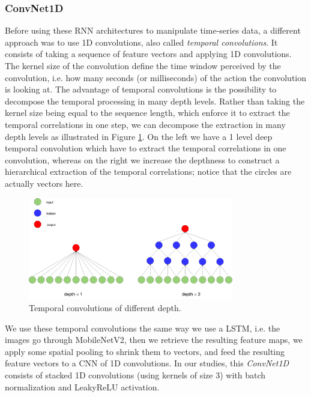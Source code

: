 \documentclass[12pt, a4paper]{report}
\begin{document}
				\subsubsection{ConvNet1D}
					Before using these RNN architectures to manipulate time-series data, a different approach was to use 1D convolutions, also called {\itshape temporal convolutions}.
					It consists of taking a sequence of feature vectors and applying 1D convolutions.
					The kernel size of the convolution define the time window perceived by the convolution, i.e. how many seconds (or milliseconds) of the action the convolution is looking at.
					The advantage of temporal convolutions is the possibility to decompose the temporal processing in many depth levels.
					Rather than taking the kernel size being equal to the sequence length, which enforce it to extract the temporal correlations in one step, we can decompose the extraction in many depth levels as illustrated in Figure \ref{temp_conv}.
					On the left we have a 1 level deep temporal convolution which have to extract the temporal correlations in one convolution, whereas on the right we increase the depthness to construct a hierarchical extraction of the temporal correlations; notice that the circles are actually vectors here.
					\begin{figure}[h!]
						\centering
						\includegraphics[width=0.8\textwidth]{temporal_convolution.png}
						\caption{Temporal convolutions of different depth.}\label{temp_conv}
					\end{figure}
					\par
					We use these temporal convolutions the same way we use a LSTM, i.e. the images go through MobileNetV2, then we retrieve the resulting feature maps, we apply some spatial pooling to shrink them to vectors, and feed the resulting feature vectors to a CNN of 1D convolutions.
					In our studies, this {\itshape ConvNet1D} consists of stacked 1D convolutions (using kernels of size 3) with batch normalization and LeakyReLU activation.
\end{document}
